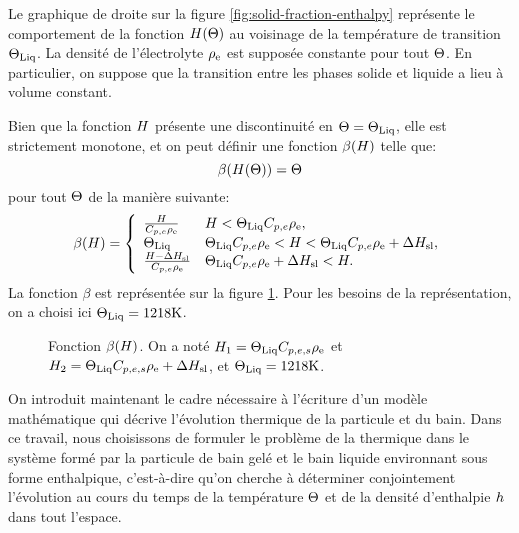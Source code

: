Le graphique de droite sur la figure \ref{fig:solid-fraction-enthalpy}
représente le comportement de la fonction $H(\Theta)$ au
voisinage de la température de transition $\Theta_\text{Liq}$. La densité de
l'électrolyte $\rho_\mathrm{e}$ est supposée constante pour tout
$\Theta$. En particulier, on suppose que la transition entre les
phases solide et liquide a lieu à volume constant.

Bien que la fonction $H$ présente une discontinuité en
$\Theta = \Theta_\text{Liq}$, elle est strictement monotone, et on peut
définir une fonction $\beta(H)$ telle que:
\begin{equation}
\beta(H(\Theta)) = \Theta
\end{equation}
pour tout $\Theta$ de la manière suivante:
\begin{equation}
  \beta(\enthalpy) = \left\{
  \begin{array}{ll}
    \frac{\enthalpy}{\electrolytehc\electrolytedensity} %
      & \enthalpy < \tliq \electrolytehc\electrolytedensity,\\
    \tliq %
      & \tliq \electrolytehc\electrolytedensity < \enthalpy < \tliq \electrolytehc\electrolytedensity + \fusionenthalpy,\\
    \frac{\enthalpy - \fusionenthalpy}{\electrolytehc\electrolytedensity} %
      & \tliq\electrolytehc\electrolytedensity + \fusionenthalpy < \enthalpy.\\
  \end{array}
  \right.
\end{equation}
La fonction $\beta$ est représentée sur la figure \ref{fig:beta}. Pour
les besoins de la représentation, on a choisi ici $\Theta_\text{Liq} = 1218\si{\kelvin}$.
\begin{figure}
  \begin{center}
    
    \caption{Fonction $\beta(H)$. On a noté $H_1 =
      \Theta_\text{Liq}C_{p,e,s}\rho_\mathrm{e}$ et $H_2 =
      \Theta_\text{Liq}C_{p,e,s}\rho_\mathrm{e} + \Delta H_\mathrm{sl}$, et
      $\Theta_\text{Liq} = 1218\si{\kelvin}$.}
    \label{fig:beta}
  \end{center}
\end{figure}

On introduit maintenant le cadre nécessaire à l'écriture d'un modèle
mathématique qui décrive l'évolution thermique de la particule et du
bain. Dans ce travail, nous choisissons de formuler le problème de la
thermique dans le système formé par la particule de bain gelé et le
bain liquide environnant sous forme enthalpique, c'est-à-dire qu'on
cherche à déterminer conjointement l'évolution au cours du temps de la
température $\Theta$ et de la densité d'enthalpie
$h$ dans tout l'espace.

